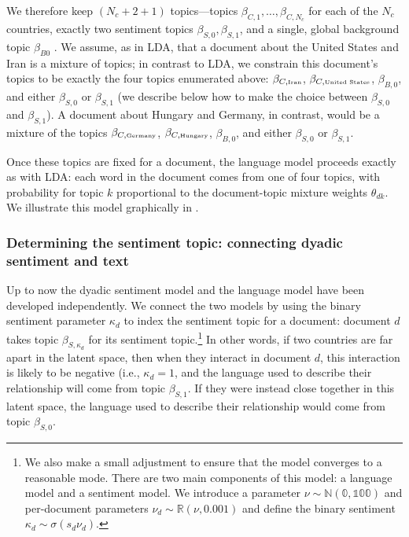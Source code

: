 We therefore keep $(N_c + 2 + 1)$ topics---topics $\beta_{C,1},
\ldots, \beta_{C,{N_c}}$ for each of the $N_c$ countries, exactly two
sentiment topics $\beta_{S,0}, \beta_{S,1}$, and a single, global
background topic $\beta_{B0}$ \cite{chemudugunta:2009}.  We assume, as in LDA, that a document
about the United States and Iran is a mixture of topics; in contrast
to LDA, we constrain this document's topics to be exactly the four
topics enumerated above: $\beta_{C,\mbox{\tiny Iran}}$,
$\beta_{C,\mbox{\tiny United States}}$, $\beta_{B,0}$, and either
$\beta_{S,0}$ or $\beta_{S,1}$ (we describe below how to make the
choice between $\beta_{S,0}$ and $\beta_{S,1}$).  A document about
Hungary and Germany, in contrast, would be a mixture of the topics
$\beta_{C,\mbox{\tiny Germany}}$, $\beta_{C,\mbox{\tiny Hungary}}$,
$\beta_{B,0}$, and either $\beta_{S,0}$ or $\beta_{S,1}$.

Once these topics are fixed for a document, the language model
proceeds exactly as with LDA: each word in the document comes from one
of four topics, with probability for topic $k$ proportional to the
document-topic mixture weights $\theta_{dk}$.  We illustrate this
model graphically in .

\subsubsection{Determining the sentiment topic: connecting dyadic sentiment and text}

Up to now the dyadic sentiment model and the language model have been
developed independently.  We connect the two models by using the binary
sentiment parameter $\kappa_d$ to index the sentiment topic for a
document: document $d$ takes topic $\beta_{S,\kappa_d}$ for its
sentiment topic.\footnote{We also make a small adjustment to ensure
  that the model converges to a reasonable mode.  There are two main
  components of this model: a language model and a sentiment model. We
  introduce a parameter $\nu \sim \mathbb{N(0, 100)}$ and per-document
  parameters $\nu_d \sim \mathbb{R}(\nu, 0.001)$ and define the binary
  sentiment $\kappa_d \sim \sigma(s_d \nu_d)$.}
In other words, if two countries are far apart in the latent space,
then when they interact in document $d$, this interaction is likely to
be negative (i.e., $\kappa_d = 1$, and the language used to
describe their relationship will come from topic $\beta_{S, 1}$.  If
they were instead close together in this latent space, the language used to describe their relationship would come from topic $\beta_{S, 0}$.


